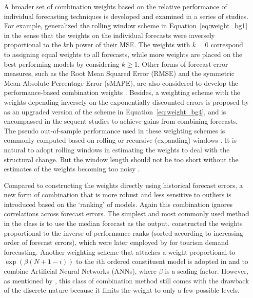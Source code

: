 \documentclass[11pt]{article}
\begin{document}
A broader set of combination weights based on the relative performance of individual forecasting techniques is developed and examined in a series of studies. For example, \cite{Stock1998-np} generalized the rolling window scheme in Equation~\eqref{eq:weight_bg1} in the sense that the weights on the individual forecasts were inversely proportional to the $k$th power of their MSE. The weights with $k=0$ correspond to assigning equal weights to all forecasts, while more weights are placed on the best performing models by considering $k \geq 1$. Other forms of forecast error measures, such as the Root Mean Squared Error (RMSE) and the symmetric Mean Absolute Percentage Error (sMAPE), are also considered to develop the performance-based combination weights \citep[e.g.,][]{Nowotarski2014-ev,Pawlikowski2020-hm}. Besides, a weighting scheme with the weights depending inversely on the exponentially discounted errors is proposed by \cite{Stock2004-rq} as an upgraded version of the scheme in Equation~\eqref{eq:weight_bg4}, and is encompassed in the sequent studies \citep[e.g.,][]{Clark2010-jx,Genre2013-ut} to achieve gains from combining forecasts. The pseudo out-of-sample performance used in these weighting schemes is commonly computed based on rolling or recursive (expanding) windows \citep[e.g.,][]{Stock1998-np,Clark2010-jx,Genre2013-ut}. It is natural to adopt rolling windows in estimating the weights to deal with the structural change. But the window length should not be too short without the estimates of the weights becoming too noisy \citep{Baumeister2015-ft}.

Compared to constructing the weights directly using historical forecast errors, a new form of combination that is more robust and less sensitive to outliers is introduced based on the `ranking' of models. Again this combination ignores correlations across forecast errors. The simplest and most commonly used method in the class is to use the median forecast as the output. \cite{Aiolfi2006-rh} constructed the weights proportional to the inverse of performance ranks (sorted according to increasing order of forecast errors), which were later employed by \cite{Andrawis2011-kb} for tourism demand forecasting. Another weighting scheme that attaches a weight proportional to $\exp (\beta(N+1-i))$ to the $i$th ordered constituent model is adopted in \cite{Yao2008-or} and \cite{Donate2013-lq} to combine Artificial Neural Networks (ANNs), where $\beta$ is a scaling factor. However, as mentioned by \cite{Andrawis2011-kb}, this class of combination method still comes with the drawback of the discrete nature because it limits the weight to only a few possible levels.
\end{document}
